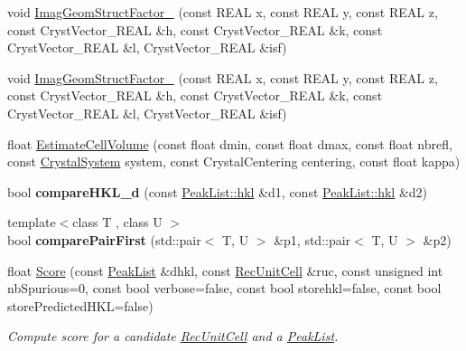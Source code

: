 \begin{DoxyCompactItemize}
\item 
void \mbox{\hyperlink{namespace_obj_cryst_a1ba7e310cee99bb6d2463ab8f73d3357}{Imag\+Geom\+Struct\+Factor\+\_}} (const R\+E\+AL x, const R\+E\+AL y, const R\+E\+AL z, const Cryst\+Vector\+\_\+\+R\+E\+AL \&h, const Cryst\+Vector\+\_\+\+R\+E\+AL \&k, const Cryst\+Vector\+\_\+\+R\+E\+AL \&l, Cryst\+Vector\+\_\+\+R\+E\+AL \&isf)
\item 
void \mbox{\hyperlink{namespace_obj_cryst_a016c95a5ff6be845576d07ce118b59ef}{Imag\+Geom\+Struct\+Factor\+\_}} (const R\+E\+AL x, const R\+E\+AL y, const R\+E\+AL z, const Cryst\+Vector\+\_\+\+R\+E\+AL \&h, const Cryst\+Vector\+\_\+\+R\+E\+AL \&k, const Cryst\+Vector\+\_\+\+R\+E\+AL \&l, Cryst\+Vector\+\_\+\+R\+E\+AL \&isf)
\item 
float \mbox{\hyperlink{namespace_obj_cryst_a4d39fa9e9e695122208106dea0bdd018}{Estimate\+Cell\+Volume}} (const float dmin, const float dmax, const float nbrefl, const \mbox{\hyperlink{namespace_obj_cryst_a9cd1d00f4ec9f0e75564ee151f47dd83}{Crystal\+System}} system, const Crystal\+Centering centering, const float kappa)
\item 
\mbox{\label{namespace_obj_cryst_ade6ea77b278b58757404d43708067a0b}} 
bool {\bfseries compare\+H\+K\+L\+\_\+d} (const \mbox{\hyperlink{struct_obj_cryst_1_1_peak_list_1_1hkl}{Peak\+List\+::hkl}} \&d1, const \mbox{\hyperlink{struct_obj_cryst_1_1_peak_list_1_1hkl}{Peak\+List\+::hkl}} \&d2)
\item 
\mbox{\label{namespace_obj_cryst_a26df95ea36af93f7600ef44f749189e8}} 
{\footnotesize template$<$class T , class U $>$ }\\bool {\bfseries compare\+Pair\+First} (std\+::pair$<$ T, U $>$ \&p1, std\+::pair$<$ T, U $>$ \&p2)
\item 
\mbox{\label{namespace_obj_cryst_a5a702febb46b199ca5a4fd5a05372ab2}} 
float \mbox{\hyperlink{namespace_obj_cryst_a5a702febb46b199ca5a4fd5a05372ab2}{Score}} (const \mbox{\hyperlink{class_obj_cryst_1_1_peak_list}{Peak\+List}} \&dhkl, const \mbox{\hyperlink{class_obj_cryst_1_1_rec_unit_cell}{Rec\+Unit\+Cell}} \&ruc, const unsigned int nb\+Spurious=0, const bool verbose=false, const bool storehkl=false, const bool store\+Predicted\+H\+KL=false)
\begin{DoxyCompactList}\small\item\em Compute score for a candidate \mbox{\hyperlink{class_obj_cryst_1_1_rec_unit_cell}{Rec\+Unit\+Cell}} and a \mbox{\hyperlink{class_obj_cryst_1_1_peak_list}{Peak\+List}}. \end{DoxyCompactList}\item 

\end{DoxyCompactItemize}
